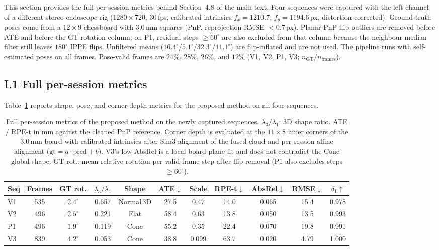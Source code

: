 \documentclass[review]{elsarticle}
\begin{document}
This section provides the full per-session metrics behind Section~4.8 of the main text. Four sequences were captured with the left channel of a different stereo-endoscope rig ($1280{\times}720$, 30\,fps, calibrated intrinsics $f_x{=}1210.7$, $f_y{=}1194.6$\,px, distortion-corrected). Ground-truth poses come from a $12{\times}9$ chessboard with $3.0$\,mm squares (PnP, reprojection RMSE ${<}0.7$\,px). Planar-PnP flip outliers are removed before ATE and before the GT-rotation column; on P1, residual steps ${\geq}60^{\circ}$ are also excluded from that column because the neighbour-median filter still leaves $180^{\circ}$ IPPE flips. Unfiltered means ($16.4^{\circ}$/$5.1^{\circ}$/$32.3^{\circ}$/$11.1^{\circ}$) are flip-inflated and are not used. The pipeline runs with self-estimated poses on all frames. Pose-valid frames are $24\%$, $28\%$, $26\%$, and $12\%$ (V1, V2, P1, V3; $n_{\mathrm{GT}}/n_{\mathrm{frames}}$).

\subsection*{I.1 Full per-session metrics}

Table~\ref{tab:supp_new_capture_full} reports shape, pose, and corner-depth metrics for the proposed method on all four sequences.

\begin{table}[h]
\centering
\caption{Full per-session metrics of the proposed method on the newly captured sequences. $\lambda_3/\lambda_1$: 3D shape ratio. ATE / RPE-t in mm against the cleaned PnP reference. Corner depth is evaluated at the $11{\times}8$ inner corners of the $3.0$\,mm board with calibrated intrinsics after Sim3 alignment of the fused cloud and per-session affine alignment ($\mathrm{gt}=a{\cdot}\mathrm{pred}+b$). V3's low AbsRel is a local board-plane fit and does not contradict the Cone global shape. GT rot.: mean relative rotation per valid-frame step after flip removal (P1 also excludes steps ${\geq}60^{\circ}$).}
\label{tab:supp_new_capture_full}
\setlength{\tabcolsep}{4pt}
\renewcommand{\arraystretch}{1.05}
\footnotesize
\begin{tabular}{l ccc ccc ccc c}
\toprule
Seq & Frames & GT rot. & $\lambda_3/\lambda_1$ & Shape & ATE$\downarrow$ & Scale & RPE-t$\downarrow$ & AbsRel$\downarrow$ & RMSE$\downarrow$ & $\delta_1$$\uparrow$ \\
\midrule
V1 & 535 & $2.4^{\circ}$ & 0.657 & Normal\,3D & 27.5 & 0.47 & 14.0 & 0.065 & 15.4 & 0.978 \\
V2 & 496 & $2.5^{\circ}$ & 0.221 & Flat & 58.4 & 0.63 & 13.8 & 0.050 & 13.5 & 0.993 \\
P1 & 496 & $1.9^{\circ}$ & 0.119 & Cone & 55.2 & 0.35 & 22.4 & 0.070 & 19.8 & 0.991 \\
V3 & 839 & $4.2^{\circ}$ & 0.053 & Cone & 38.8 & 0.099 & 63.7 & 0.020 & 4.79 & 1.000 \\
\bottomrule
\end{tabular}
\end{table}
\end{document}
